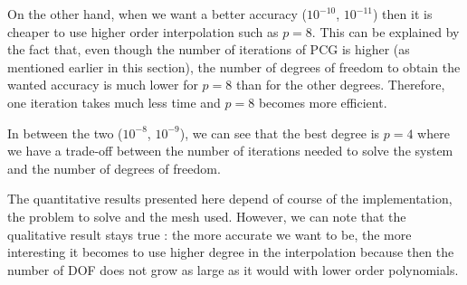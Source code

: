 On the other hand, when we want a better accuracy ($10^{-10}$, $10^{-11}$) then it is cheaper to use higher order interpolation such as $p=8$. This can be explained by the fact that, even though the number of iterations of PCG is higher (as mentioned earlier in this section), the number of degrees of freedom to obtain the wanted accuracy is much lower for $p=8$ than for the other degrees. Therefore, one iteration takes much less time and $p=8$ becomes more efficient. 

In between the two ($10^{-8}$, $10^{-9}$), we can see that the best degree is $p=4$ where we have a trade-off between the number of iterations needed to solve the system and the number of degrees of freedom.

The quantitative results presented here depend of course of the implementation, the problem to solve and the mesh used. However, we can note that the qualitative result stays true : the more accurate we want to be, the more interesting it becomes to use higher degree in the interpolation because then the number of DOF does not grow as large as it would with lower order polynomials. 




